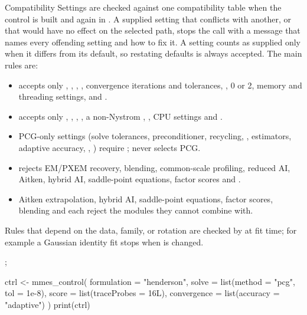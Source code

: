\documentclass[a4paper]{book}
\begin{document}
\begin{Section}{Compatibility}
Settings are checked against one compatibility table when the control is
built and again in . A supplied setting that conflicts with
another, or that would have no effect on the selected path, stops the call with
a message that names every offending setting and how to fix it. A setting counts
as supplied only when it differs from its default, so restating defaults is
always accepted. The main rules are:
\begin{itemize}

\item{}  accepts only , ,
,
, convergence iterations and tolerances,
,  0 or 2, memory
and threading  settings, and .
\item{}  accepts only , ,
, , a non-Nystrom
, , CPU  settings and
.
\item{} PCG-only settings (solve tolerances, preconditioner, recycling,
,  estimators, adaptive accuracy,
, ) require
;  never selects PCG.
\item{}  rejects EM/PXEM recovery, blending,
common-scale profiling, reduced AI, Aitken, hybrid AI, saddle-point
equations, factor scores and .
\item{} Aitken extrapolation, hybrid AI, saddle-point equations, factor scores,
blending and  each reject the modules
they cannot combine with.

\end{itemize}

Rules that depend on the data, family,  or rotation are checked by
 at fit time; for example a Gaussian identity fit stops when
 is changed.
\end{Section}
%
\begin{SeeAlso}\relax
{}; 
\end{SeeAlso}
%
\begin{Examples}
\begin{ExampleCode}
ctrl <- mmes_control(
  formulation = "henderson",
  solve = list(method = "pcg", tol = 1e-8),
  score = list(traceProbes = 16L),
  convergence = list(accuracy = "adaptive")
)
print(ctrl)
\end{ExampleCode}
\end{Examples}
\end{document}
